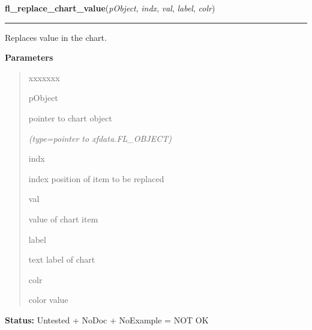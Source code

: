 \hspace{.8\funcindent}\begin{boxedminipage}{\funcwidth}

    \raggedright \textbf{fl\_replace\_chart\_value}(\textit{pObject}, \textit{indx}, \textit{val}, \textit{label}, \textit{colr})

    \vspace{-1.5ex}

    \rule{\textwidth}{0.5\fboxrule}
\setlength{\parskip}{2ex}
    Replaces value in the chart.

\setlength{\parskip}{1ex}
      \textbf{Parameters}
      \vspace{-1ex}

      \begin{quote}
        \begin{Ventry}{xxxxxxx}

          \item[pObject]

          pointer to chart object

            {\it (type=pointer to xfdata.FL\_OBJECT)}

          \item[indx]

          index position of item to be replaced

          \item[val]

          value of chart item

          \item[label]

          text label of chart

          \item[colr]

          color value

        \end{Ventry}

      \end{quote}

\textbf{Status:} Untested + NoDoc + NoExample = NOT OK



    \end{boxedminipage}

    \label{xformslib:library:fl_set_chart_bounds}

    \vspace{0.5ex}

